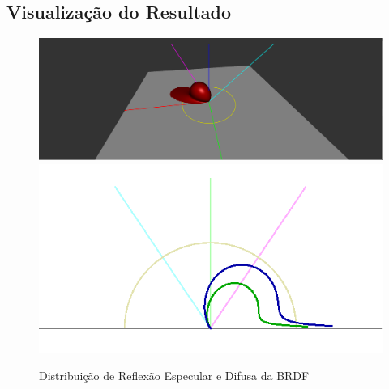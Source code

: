 \subsection{Visualização do Resultado}
\begin{figure}[H]
    \caption{\small{Distribuição de Reflexão Especular e Difusa da BRDF}}\label{fig-cook-torrance-alternative-plots}
    \vspace{42px}
  \includegraphics[width=\linewidth]{./Imagens/brdfs/cook-torrance-alternative-3D-plot}
\endminipage\hfill
{}
  \includegraphics[width=\linewidth]{./Imagens/brdfs/cook-torrance-alternative-polar-plot-log.png}
\endminipage\hfill
\end{figure}

